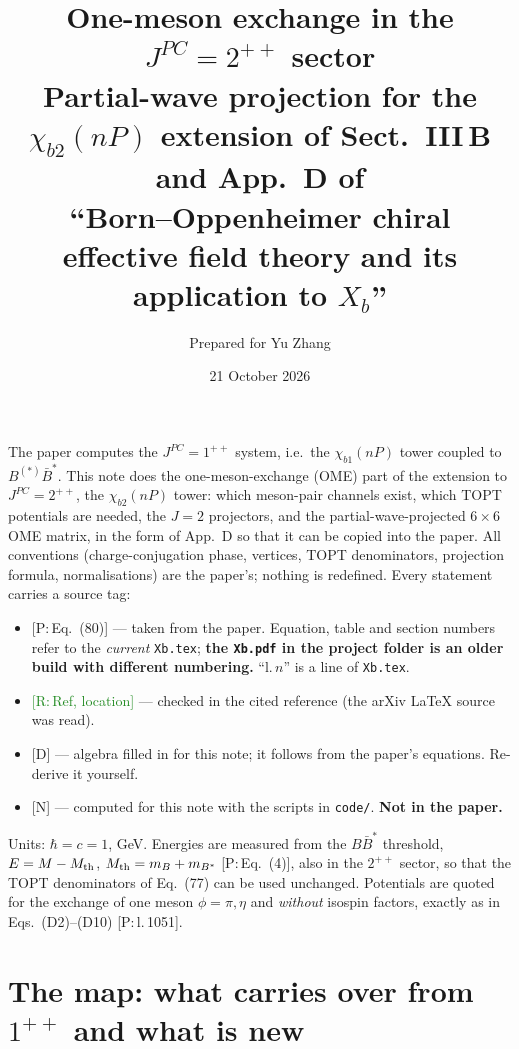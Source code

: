 \documentclass[11pt,a4paper]{article}
\title{\textbf{One-meson exchange in the $J^{PC}=2^{++}$ sector}\\[3pt]
\large Partial-wave projection for the $\chi_{b2}(nP)$ extension of Sect.~III\,B and App.~D of\\
``Born--Oppenheimer chiral effective field theory and its application to $X_b$''}
\author{Prepared for Yu Zhang}
\date{21 October 2026}
\newcommand{\tagP}[1]{\textcolor{blue!65!black}{\textsf{\small[P:\,#1]}}}
\newcommand{\tagR}[1]{\textcolor{ForestGreen}{\textsf{\small[R:\,#1]}}}
\newcommand{\tagD}{\textcolor{orange!85!black}{\textsf{\small[D]}}}
\newcommand{\tagN}{\textcolor{red!70!black}{\textsf{\small[N]}}}
\newcommand{\BBst}{B\bar B^*}
\newcommand{\Mth}{M_{\rm th}}
\begin{document}
\maketitle

\begin{keybox}
The paper computes the $J^{PC}=1^{++}$ system, i.e.\ the $\chi_{b1}(nP)$ tower coupled to $B^{(*)}\bar B^{*}$. This note does the one-meson-exchange (OME) part of the extension to $J^{PC}=2^{++}$, the $\chi_{b2}(nP)$ tower: which meson-pair channels exist, which TOPT potentials are needed, the $J=2$ projectors, and the partial-wave-projected $6\times6$ OME matrix, in the form of App.~D so that it can be copied into the paper. All conventions (charge-conjugation phase, vertices, TOPT denominators, projection formula, normalisations) are the paper's; nothing is redefined. Every statement carries a source tag:
\begin{itemize}
\item \tagP{Eq.~(80)} --- taken from the paper. Equation, table and section numbers refer to the \emph{current} \texttt{Xb.tex}; \textbf{the \texttt{Xb.pdf} in the project folder is an older build with different numbering.} ``l.\,$n$'' is a line of \texttt{Xb.tex}.
\item \tagR{Ref, location} --- checked in the cited reference (the arXiv \LaTeX{} source was read).
\item \tagD{} --- algebra filled in for this note; it follows from the paper's equations. Re-derive it yourself.
\item \tagN{} --- computed for this note with the scripts in \texttt{code/}. \textbf{Not in the paper.}
\end{itemize}
Units: $\hbar=c=1$, GeV. Energies are measured from the $\BBst$ threshold, $E=M-\Mth$, $\Mth=m_B+m_{B^*}$ \tagP{Eq.~(4)}, also in the $2^{++}$ sector, so that the TOPT denominators of Eq.~(77) can be used unchanged. Potentials are quoted for the exchange of one meson $\phi=\pi,\eta$ and \emph{without} isospin factors, exactly as in Eqs.~(D2)--(D10) \tagP{l.\,1051}.
\end{keybox}

\tableofcontents
\newpage

\section{The map: what carries over from $1^{++}$ and what is new}
\label{sec:map}
\end{document}
